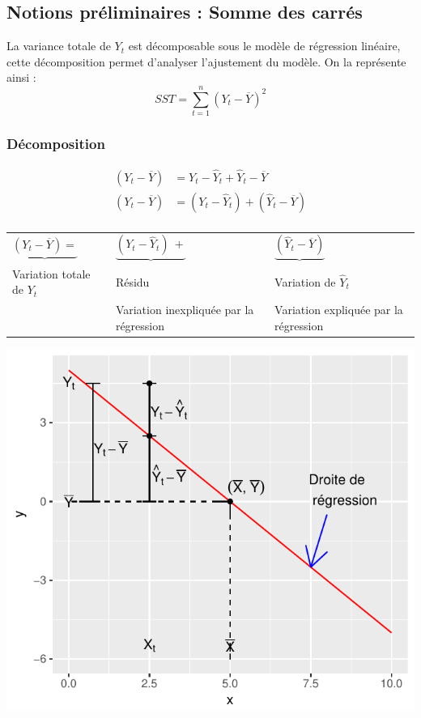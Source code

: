 \documentclass[11pt,french]{report}
\begin{document}
\subsection{Notions préliminaires : Somme des carrés}
\label{NotionPrelim}
La variance totale de $Y_t$ est décomposable sous le modèle de régression linéaire, cette décomposition permet d'analyser l'ajustement du modèle. On la représente ainsi :
$$
SST = \displaystyle\sum_{t=1}^n(Y_t-\overline{Y})^2
$$
\bigskip
\subsubsection*{Décomposition}
\begin{align*}
(Y_t - \overline{Y}) &= Y_t - \hat{Y}_t + \hat{Y}_t - \overline{Y} \\
(Y_t - \overline{Y}) &= (Y_t - \hat{Y}_t) + (\hat{Y}_t - \overline{Y}) \\
\end{align*}

\begin{center}
\begin{tabularx}{\textwidth}{XXX}
$\underbrace{(Y_t - \overline{Y}) =} $ & $\underbrace{(Y_t - \hat{Y}_t) \  +}$ & $\underbrace{(\hat{Y}_t - \overline{Y})}$ \\
Variation totale de $Y_t$  & Résidu & Variation de $\hat{Y}_t$\\
& Variation inexpliquée \newline par la régression & Variation expliquée \newline par la régression \\
\end{tabularx}
\end{center}

\includegraphics{notes_de_cours-013}
\end{document}
